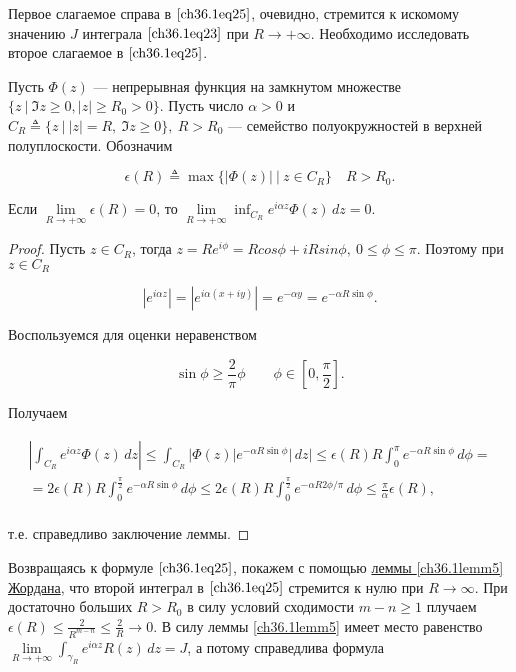 Первое слагаемое справа в $\eqref{ch36.1eq25}$, очевидно, стремится к искомому значению $J$ интеграла $\eqref{ch36.1eq23}$ при $R \to +\infty$. Необходимо исследовать второе слагаемое в $\eqref{ch36.1eq25}$.

\begin{lemm} [Жордана] \label{ch36.1lemm5}
Пусть $\Phi(z)$ --- непрерывная функция на замкнутом множестве $\{ z \: \big| \: \Im z \ge 0, |z| \ge R_0 > 0 \}$. Пусть число $\alpha > 0$ и $C_R \triangleq \{ z \: \big| \: |z| = R, \: \Im z \ge 0 \}, \: R > R_0$ --- семейство полуокружностей в верхней полуплоскости. Обозначим

$$
\epsilon(R) \triangleq \max \{ |\Phi(z)| \: \big| \: z \in C_R \} \quad R > R_0.
$$

Если $\lim\limits_{R \to +\infty} \epsilon(R) = 0$, то $\lim\limits_{R \to +\infty} \inf_{C_R} e^{i \alpha z} \Phi(z) \,dz = 0$.

\end{lemm}

\begin{proof}
Пусть $z \in C_R$, тогда $z = Re^{i\phi} = Rcos\phi + iRsin\phi, \: 0 \le \phi \le \pi$. Поэтому при $z \in C_R$

$$
|e^{i \alpha z}| = |e^{i \alpha(x + iy)}| = e^{-\alpha y} = e^{- \alpha R \sin\phi}.
$$

Воспользуемся для оценки неравенством

\begin{equation} \label{ch36.1eq26}
\sin \phi \ge \frac{2}{\pi}\phi \quad \text{} \quad \phi \in \left[ 0, \frac{\pi}{2}\right].
\end{equation}

Получаем

\begin{multline*}
\left| \int_{C_R} e^{i \alpha z} \Phi(z)\,dz \right| \le \int_{C_R} |\Phi(z)|e^{-\alpha R \sin \phi}|\,dz| \le \epsilon(R)R \int_0^\pi e^{-\alpha R \sin\phi} \,d\phi =\\= 2\epsilon(R)R \int_0^{\frac{\pi}{2}} e^{-\alpha R \sin\phi} \,d\phi \le 2\epsilon(R)R \int_0^{\frac{\pi}{2}} e^{-\alpha R 2\phi / \pi} \,d\phi \le \frac{\pi}{\alpha} \epsilon(R),\\
\end{multline*}

т.е. справедливо заключение леммы.
\end{proof}

Возвращаясь к формуле $\eqref{ch36.1eq25}$, покажем с помощью \hyperref[ch36.1lemm5]{леммы \ref{ch36.1lemm5} Жордана}, что второй интеграл в $\eqref{ch36.1eq25}$ стремится к нулю при $R \to \infty$. При достаточно больших $R > R_0$ в силу условий сходимости $m - n \ge 1$ плучаем $\epsilon(R) \le \frac{2}{R^{m - n}} \le \frac{2}{R} \to 0$. В силу леммы  \ref{ch36.1lemm5} имеет место равенство $\lim\limits_{R \to +\infty} \int_{\gamma_R} e^{i \alpha z}R(z) \,dz = J$, а потому справедлива формула

